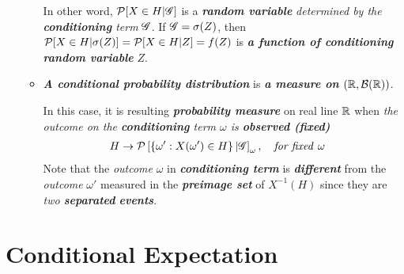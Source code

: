 \documentclass[11pt]{article}
\begin{document}
\begin{itemize}
\begin{remark}
\begin{itemize}
 In other word, ${\mathcal P}[X \in H | {\mathscr G}]$ is a \emph{\textbf{random variable}} \emph{determined by the \textbf{conditioning} term} ${\mathscr G}$. If ${\mathscr G} = \sigma(Z)$, then ${\mathcal P}[X \in H |  \sigma(Z)] = {\mathcal P}[X \in H | Z] = f(Z)$ is \emph{\textbf{a function of conditioning random variable}} $Z$.
 
 \item \emph{\textbf{A conditional probability distribution}} is \emph{\textbf{a measure on $({\mathbb R}, {\mathcal B}({\mathbb R}))$}}. 
 
 In this case, it is resulting \emph{\textbf{probability measure}} on real line ${\mathbb R}$ when \emph{the outcome on the \textbf{conditioning} term $\omega$ is \textbf{observed (fixed)}}
 \begin{align*}
 H &\rightarrow {\mathcal P}\left[\left\{\omega': X(\omega') \in H\right\} | {\mathscr G}\right]_{\omega}, \quad \text{\emph{for fixed }}\omega
\end{align*}
Note that the \emph{outcome} $\omega$ in \emph{\textbf{conditioning term}} is \textbf{\emph{different}} from the \emph{outcome} $\omega'$ measured in the \emph{\textbf{preimage set}} of $X^{-1}(H)$ since they are  \emph{two \textbf{separated} \textbf{events}}.
\end{itemize}
\end{remark}
\end{itemize}

\section{Conditional Expectation}
\end{document}
